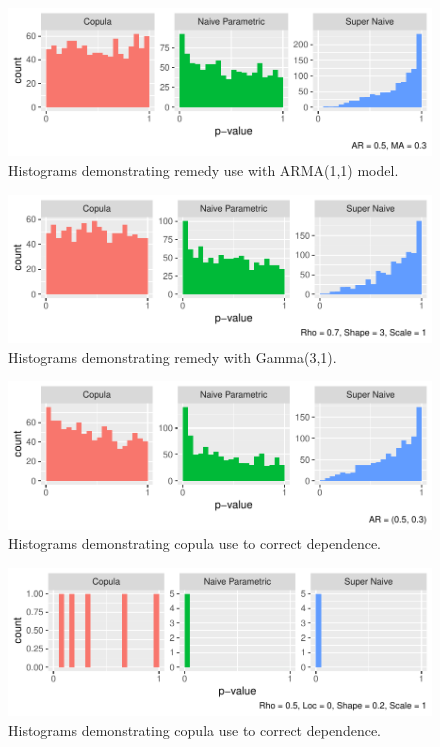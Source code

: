 \documentclass[12pt, letterpaper, titlepage]{article}
\begin{document}
\begin{figure}[tbp]
  \centering
  \includegraphics{hist_copula_arma}
  \caption{Histograms demonstrating remedy use with ARMA(1,1) model.}
  \label{fig:hist_copula_arma}
\end{figure}

\begin{figure}[tbp]
  \centering
  \includegraphics{hist_copula_gamma}
  \caption{Histograms demonstrating remedy with Gamma(3,1).}
  \label{fig:hist_copula_gamma}
\end{figure}

\begin{figure}[tbp]
  \centering
  \includegraphics{hist_copula_ar2}
  \caption{Histograms demonstrating copula use to correct dependence.}
  \label{fig:hist_copula_ar2}
\end{figure}

\begin{figure}[tbp]
  \centering
  \includegraphics{hist_copula_gev}
  \caption{Histograms demonstrating copula use to correct dependence.}
  \label{fig:hist_copula_gev}
\end{figure}
\end{document}
